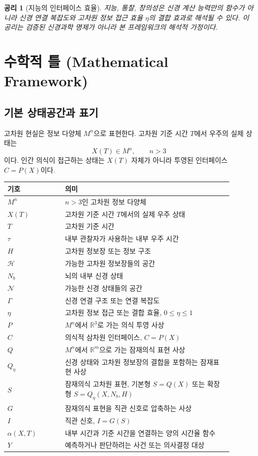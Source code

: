 \documentclass[11pt]{article}
\newtheorem{axiom}{공리}
\theoremstyle{remark}
\begin{document}
\begin{axiom}[지능의 인터페이스 효율]
지능, 통찰, 창의성은 신경 계산 능력만의 함수가 아니라 신경 연결 복잡도와
고차원 정보 접근 효율 $\eta$의 결합 효과로 해석될 수 있다. 이 공리는
검증된 신경과학 명제가 아니라 본 프레임워크의 해석적 가정이다.
\end{axiom}

\section{수학적 틀 (Mathematical Framework)}

\subsection{기본 상태공간과 표기}

고차원 현실은 정보 다양체 $M^n$으로 표현한다. 고차원 기준 시간 $T$에서
우주의 실제 상태는
\begin{equation}
  X(T) \in M^n,\qquad n>3
\end{equation}
이다. 인간 의식이 접근하는 상태는 $X(T)$ 자체가 아니라 투영된 인터페이스
$C=P(X)$이다.

\begin{center}
\begin{tabular}{>{\raggedright\arraybackslash}p{0.23\linewidth}p{0.67\linewidth}}
\toprule
\textbf{기호} & \textbf{의미} \\
\midrule
$M^n$ & $n>3$인 고차원 정보 다양체 \\
$X(T)$ & 고차원 기준 시간 $T$에서의 실제 우주 상태 \\
$T$ & 고차원 기준 시간 \\
$\tau$ & 내부 관찰자가 사용하는 내부 우주 시간 \\
$H$ & 고차원 정보장 또는 정보 구조 \\
$\mathcal{H}$ & 가능한 고차원 정보장들의 공간 \\
$N_b$ & 뇌의 내부 신경 상태 \\
$\mathcal{N}$ & 가능한 신경 상태들의 공간 \\
$\Gamma$ & 신경 연결 구조 또는 연결 복잡도 \\
$\eta$ & 고차원 정보 접근 또는 결합 효율, $0\le\eta\le 1$ \\
$P$ & $M^n$에서 $\mathbb{R}^3$로 가는 의식 투영 사상 \\
$C$ & 의식적 삼차원 인터페이스, $C=P(X)$ \\
$Q$ & $M^n$에서 $\mathbb{R}^m$으로 가는 잠재의식 표현 사상 \\
$Q_\eta$ & 신경 상태와 고차원 정보장의 결합을 포함하는 잠재표현 사상 \\
$S$ & 잠재의식 고차원 표현, 기본형 $S=Q(X)$ 또는 확장형 $S=Q_\eta(X,N_b,H)$ \\
$G$ & 잠재의식 표현을 직관 신호로 압축하는 사상 \\
$I$ & 직관 신호, $I=G(S)$ \\
$\alpha(X,T)$ & 내부 시간과 기준 시간을 연결하는 양의 시간율 함수 \\
$Y$ & 예측하거나 판단하려는 사건 또는 의사결정 대상 \\
\bottomrule
\end{tabular}
\end{center}
\end{document}
